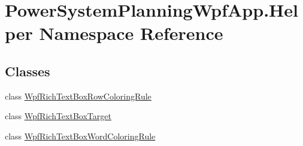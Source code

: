 \hypertarget{namespace_power_system_planning_wpf_app_1_1_helper}{}\section{Power\+System\+Planning\+Wpf\+App.\+Helper Namespace Reference}
\label{namespace_power_system_planning_wpf_app_1_1_helper}
\subsection*{Classes}
\begin{DoxyCompactItemize}
\item 
class \hyperlink{class_power_system_planning_wpf_app_1_1_helper_1_1_wpf_rich_text_box_row_coloring_rule}{Wpf\+Rich\+Text\+Box\+Row\+Coloring\+Rule}
\item 
class \hyperlink{class_power_system_planning_wpf_app_1_1_helper_1_1_wpf_rich_text_box_target}{Wpf\+Rich\+Text\+Box\+Target}
\item 
class \hyperlink{class_power_system_planning_wpf_app_1_1_helper_1_1_wpf_rich_text_box_word_coloring_rule}{Wpf\+Rich\+Text\+Box\+Word\+Coloring\+Rule}
\end{DoxyCompactItemize}
